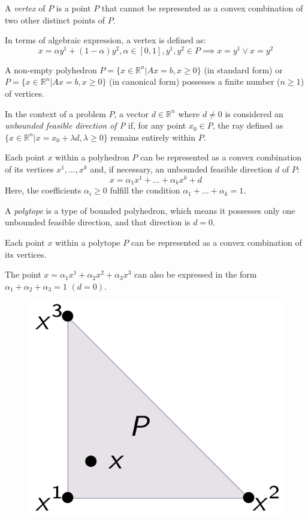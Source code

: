 \begin{definition}
    A \emph{vertex} of $P$ is a point $P$ that cannot be represented as a convex combination of two other distinct points of $P$. 
\end{definition}
In terms of algebraic expression, a vertex is defined as:
\[x= \alpha y^1+(1-\alpha)y^2, \alpha \in [0,1], y^1,y^2 \in P \implies x=y^1 \lor x=y^2\]
\begin{property}
    A non-empty polyhedron $P=\{x \in \mathbb{R}^n|Ax=b,x \geq 0\}$ (in standard form) or $P=\{x \in \mathbb{R}^n|Ax=b,x \geq 0\}$ (in canonical form) possesses a finite number ($n \geq 1$) of vertices. 
\end{property}
\begin{definition}
    In the context of a problem $P$, a vector $d \in \mathbb{R}^n$ where $d \neq 0$ is considered an \emph{unbounded feasible direction of P} if, for any  point $x_0 \in P$, the ray defined as $\{x \in \mathbb{R}^n|x=x_0+\lambda d,\lambda \geq 0\}$ remains entirely within $P$.
\end{definition}
\begin{theorem}
    Each point $x$ within a polyhedron $P$ can be represented as a convex combination of its vertices $x^1,\dots,x^k$ and, if necessary, an unbounded feasible direction $d$ of $P$: 
    \[x=\alpha_1x^1+\dots+\alpha_kx^k+d\]
    Here, the coefficients $\alpha_i \geq 0$ fulfill the condition $\alpha_1+\dots+\alpha_k=1$. 
\end{theorem}
\begin{definition}
    A \emph{polytope} is a type of bounded polyhedron, which means it possesses only one unbounded feasible direction, and that direction is $d=0$. 
\end{definition}
Each point $x$ within a polytope $P$ can be represented as a convex combination of its vertices.
\begin{example}
    The point $x=\alpha_1x^1+\alpha_2x^2+\alpha_3x^3$ can also be expressed in the form $\alpha_1+\alpha_2+\alpha_3=1$ $(d=0)$. 
    \begin{figure}[H]
        \centering
        \includegraphics[width=0.2\linewidth]{images/polytope.png}
    \end{figure}
\end{example}

